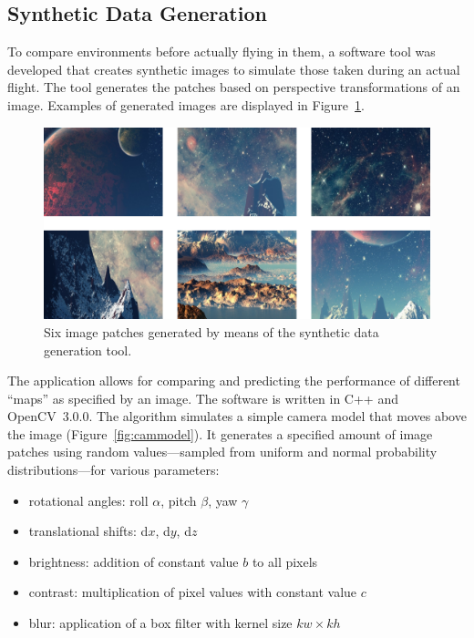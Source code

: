 \documentclass[11pt]{report}
\begin{document}


\subsection{Synthetic Data Generation}
\label{sec:syntheticdatageneration}

To compare environments before actually flying in them, a software
tool was developed that creates synthetic images to simulate those
taken during an actual flight.
The tool generates the patches based on perspective transformations of
an image. Examples of generated images are displayed in
Figure~\ref{fig:montage}.

\begin{figure}[h]
\begin{center}
\includegraphics[width=0.7\columnwidth]{samples}
\caption{{\label{fig:montage} 
Six image patches generated by means of the synthetic data generation tool.%
}}
\end{center}
\end{figure}

The application allows for comparing and predicting the performance of
different ``maps'' as specified by an image. The software is written
in C++ and OpenCV~3.0.0. 
The algorithm simulates a simple camera model that moves above the
image (Figure~\ref{fig:cammodel}).
It generates a specified amount of image
patches using random values---sampled from uniform and normal
probability distributions---for various parameters:
\begin{itemize}
\item rotational angles: roll $\alpha$, pitch $\beta$, yaw
  $\gamma$
\item translational shifts: d$x$, d$y$, d$z$
\item brightness: addition of constant value $b$ to all pixels
\item contrast: multiplication of pixel values with constant value $c$
\item blur: application of a box filter with kernel size
  $kw \times kh$
\end{itemize}
\end{document}
